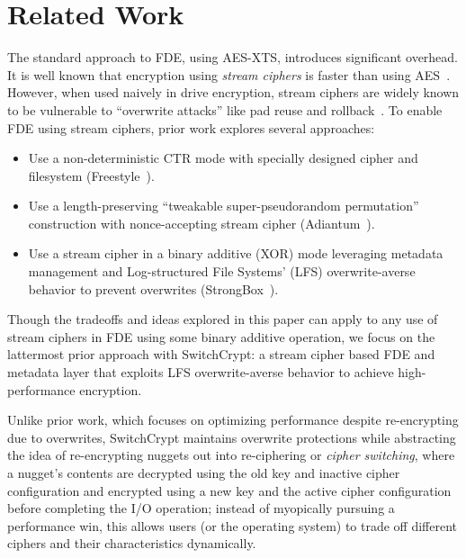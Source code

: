 \section{Related Work}\label{sec:related}

The standard approach to FDE, using AES-XTS, introduces significant overhead. It
is well known that encryption using \emph{stream ciphers} is faster than using
AES~\cite{StrongBox, AnotherPaper1, AnotherPaper2}. However, when used naively
in drive encryption, stream ciphers are widely known to be vulnerable to
``overwrite attacks'' like pad reuse and rollback~\cite{KatzLindell, StrongBox}.
To enable FDE using stream ciphers, prior work explores several approaches:

\begin{itemize}
   \item Use a non-deterministic CTR mode with specially designed cipher and
   filesystem (Freestyle~\cite{Freestyle}).
   \item Use a length-preserving ``tweakable super-pseudorandom permutation''
   construction with nonce-accepting stream cipher (Adiantum~\cite{Adiantum}).
   \item Use a stream cipher in a binary additive (XOR) mode leveraging metadata
   management and Log-structured File Systems' (LFS) overwrite-averse behavior
   to prevent overwrites (StrongBox~\cite{StrongBox}).
\end{itemize}

Though the tradeoffs and ideas explored in this paper can apply to any use of
stream ciphers in FDE using some binary additive operation, we focus on the
lattermost prior approach with SwitchCrypt: a stream cipher based FDE and
metadata layer that exploits LFS overwrite-averse behavior to achieve
high-performance encryption.

Unlike prior work, which focuses on optimizing performance despite re-encrypting
due to overwrites, SwitchCrypt maintains overwrite protections while abstracting
the idea of re-encrypting nuggets out into re-ciphering or \emph{cipher
switching}, where a nugget's contents are decrypted using the old key and
inactive cipher configuration and encrypted using a new key and the active
cipher configuration before completing the I/O operation; instead of myopically
pursuing a performance win, this allows users (or the operating system) to trade
off different ciphers and their characteristics dynamically.


